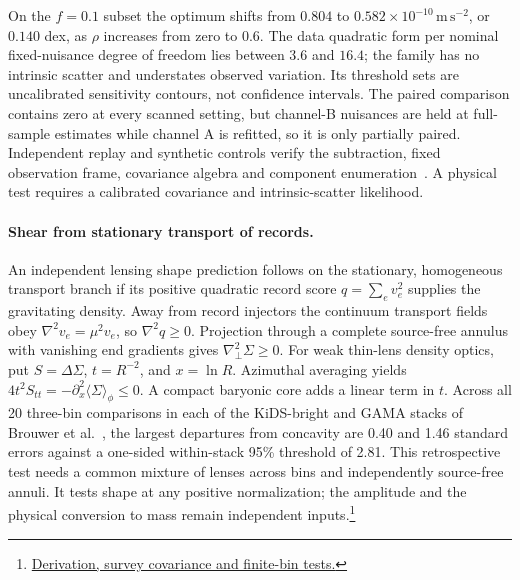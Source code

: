 \documentclass[11pt]{article}
\begin{document}
On the \(f=0.1\) subset the optimum shifts from \(0.804\) to
\(0.582\times10^{-10}\,\mathrm{m\,s^{-2}}\), or \(0.140\) dex,
as \(\rho\) increases from zero to \(0.6\). The data quadratic form per
nominal fixed-nuisance degree of freedom lies between \(3.6\) and \(16.4\);
the family has no intrinsic scatter and understates observed variation.
Its threshold sets are uncalibrated sensitivity contours, not confidence
intervals. The paired comparison contains zero at every scanned setting,
but channel-B nuisances are held at full-sample estimates while channel A
is refitted, so it is only partially paired. Independent replay and synthetic
controls verify the subtraction, fixed observation frame, covariance algebra
and component enumeration~\cite{ophrar}. A physical test requires a
calibrated covariance and intrinsic-scatter likelihood.

\paragraph{Shear from stationary transport of records.}
An independent lensing shape prediction follows on the stationary,
homogeneous transport branch if its positive quadratic record score
$q=\sum_e v_e^2$ supplies the gravitating density. Away from record
injectors the continuum transport fields obey
$\nabla^2v_e=\mu^2v_e$, so $\nabla^2 q\ge0$. Projection through a complete
source-free annulus with vanishing end gradients gives
$\nabla_\perp^2\Sigma\ge0$. For weak thin-lens density optics, put
$S=\Delta\Sigma$, $t=R^{-2}$, and $x=\ln R$.
Azimuthal averaging yields
$4t^2 S_{tt}=-\partial_x^2\langle\Sigma\rangle_\phi\le0$.
A compact baryonic core adds a linear term in $t$.
Across all 20 three-bin comparisons in each of the KiDS-bright and
GAMA stacks of Brouwer et al.~\cite{brouwer2021}, the largest
departures from concavity are 0.40 and 1.46 standard errors against
a one-sided within-stack 95\% threshold of 2.81. This retrospective
test needs a common mixture of lenses across bins and independently
source-free annuli. It tests shape at any positive normalization;
the amplitude and the physical conversion to mass remain independent
inputs.\footnote{\href{https://github.com/FloatingPragma/observer-patch-holography/tree/main/code/cosmology/rar_deep_regime/record_shear}{Derivation, survey covariance and finite-bin tests.}}
\end{document}
